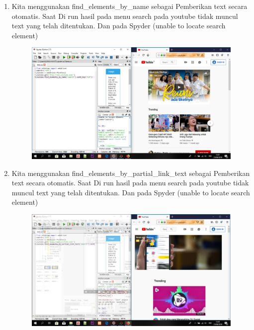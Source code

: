 \begin{enumerate}
    \item Kita menggunakan find\_elements\_by\_name sebagai Pemberikan text secara otomatis. Saat  Di run hasil pada menu search pada youtube tidak muncul text yang telah ditentukan. Dan pada Spyder {(unable to locate search element)}
\begin{figure}[!htbp]
    \centering
    \includegraphics[scale=0.3]{figure/hasilTes/11.jpeg}
    \label{gambar 1}
\end{figure}

    \item Kita menggunakan find\_elements\_by\_partial\_link\_text sebagai Pemberikan text secara otomatis. Saat  Di run hasil pada menu search pada youtube tidak muncul text yang telah ditentukan. Dan pada Spyder {(unable to locate search element)}
\begin{figure}[!htbp]
    \centering
    \includegraphics[scale=0.3]{figure/hasilTes/12.jpeg}
    \label{gambar 1}
\end{figure}

\vspace{1cm}


\end{enumerate}
